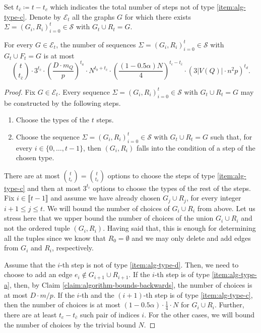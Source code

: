 \documentclass[11pt,a4paper,oneside,reqno]{amsart}
\newcommand{\cE}{\mathcal{E}}
\newcommand{\cS}{\mathcal{S}}
\newcommand{\1}{\mathbbm{1}} %
\newcommand{\br}[1]{\llbracket{#1}\rrbracket}
\renewcommand{\le}{\leqslant}
\begin{document}
Set $t_{\bar{c}} \coloneqq t - t_c$ which indicates the total number of steps not of type \ref{item:alg-type-c}. Denote by $\cE_t$ all the graphs $G$ for which there exists $\Sigma = (G_i, R_i)_{i=0}^{t} \in \cS$ with $G_t \cup R_t = G$. 
\begin{claim}\label{claim:size-of-sum-bound}
    For every $G \in \cE_t$, the number of sequences $\Sigma = (G_i, R_i)_{i=0}^{t} \in \cS$ with $G_t \cup F_t = G$ is at most
    \[
        \binom{t}{t_{\bar{c}}} \cdot 3^{t_{\bar{c}}} \cdot \left(\frac{D \cdot m_Q}{p}\right)^{t_a} \cdot N^{t_b + t_{\bar{c}}} \cdot \left(\frac{(1-0.5\alpha) N}{4}\right)^{t_c - t_{\bar{c}}} \cdot \left(3|V(Q)| \cdot n^2 p\right)^{t_d}.
    \]
\end{claim}
\begin{proof}
    Fix $G \in \cE_t$. Every sequence $\Sigma = (G_i, R_i)_{i=0}^{t} \in \cS$ with $G_t \cup R_t = G$ may be constructed by the following steps.
    \begin{enumerate}
        \item Choose the types of the $t$ steps.        
        \item Choose the sequence $\Sigma = (G_i, R_i)_{i=0}^{t} \in \cS$ with $G_t \cup R_t = G$ such that, for every $i \in \{0, \dots, t-1\}$, then $(G_i, R_i)$ falls into the condition of a step of the chosen type.
    \end{enumerate}

    There are at most $\binom{t}{t_{c}} = \binom{t}{t_{\bar{c}}}$ options to choose the steps of type \ref{item:alg-type-c} and then at most $3^{t_{\bar{c}}}$ options to choose the types of the rest of the steps. Fix $i \in \br{t-1}$ and assume we have already chosen $G_j \cup R_j$, for every integer $i+1 \le j \le t$. We will bound the number of choices of $G_i \cup R_i$ from above. Let us stress here that we upper bound the number of choices of the union $G_i \cup R_i$ and not the ordered tuple $(G_i, R_i)$. Having said that, this is enough for determining all the tuples since we know that $R_0 = \emptyset$ and we may only delete and add edges from $G_i$ and $R_i$, respectively.

    Assume that the $i$-th step is not of type \ref{item:alg-type-d}. Then, we need to choose to add an edge $e_i \notin G_{i+1} \cup R_{i+1}$. If the $i$-th step is of type \ref{item:alg-type-a}, then, by Claim \ref{claim:algorithm-bounds-backwards}, the number of choices is at most $D \cdot m / p$. If the $i$-th and the $(i+1)$-th step is of type \ref{item:alg-type-c}, then the number of choices is at most $(1-0.5\alpha) \cdot \frac{1}{4} \cdot N$ for $G_i \cup R_i$. Further, there are at least $t_c - t_{\bar{c}}$ such pair of indices $i$. For the other cases, we will bound the number of choices by the trivial bound $N$.


\end{proof}
\end{document}
